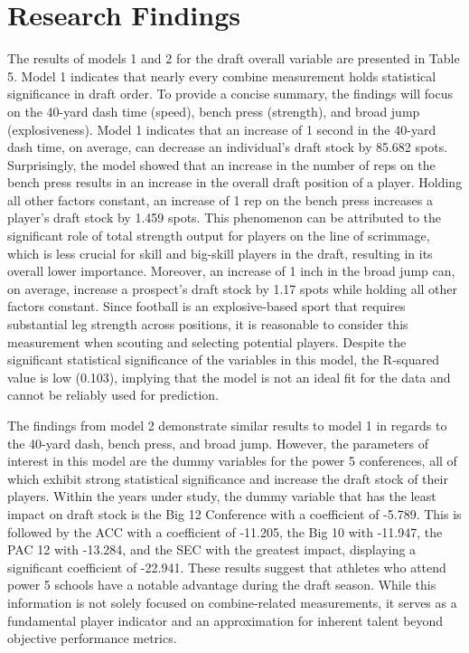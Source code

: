 \documentclass[12pt,english]{article}
\begin{document}
\section{Research Findings}\label{sec:results}
The results of models 1 and 2 for the draft overall variable are presented in Table 5. Model 1 indicates that nearly every combine measurement holds statistical significance in draft order. To provide a concise summary, the findings will focus on the 40-yard dash time (speed), bench press (strength), and broad jump (explosiveness). Model 1 indicates that an increase of 1 second in the 40-yard dash time, on average, can decrease an individual's draft stock by 85.682 spots. Surprisingly, the model showed that an increase in the number of reps on the bench press results in an increase in the overall draft position of a player. Holding all other factors constant, an increase of 1 rep on the bench press increases a player's draft stock by 1.459 spots. This phenomenon can be attributed to the significant role of total strength output for players on the line of scrimmage, which is less crucial for skill and big-skill players in the draft, resulting in its overall lower importance. Moreover, an increase of 1 inch in the broad jump can, on average, increase a prospect's draft stock by 1.17 spots while holding all other factors constant. Since football is an explosive-based sport that requires substantial leg strength across positions, it is reasonable to consider this measurement when scouting and selecting potential players. Despite the significant statistical significance of the variables in this model, the R-squared value is low (0.103), implying that the model is not an ideal fit for the data and cannot be reliably used for prediction.

The findings from model 2 demonstrate similar results to model 1 in regards to the 40-yard dash, bench press, and broad jump. However, the parameters of interest in this model are the dummy variables for the power 5 conferences, all of which exhibit strong statistical significance and increase the draft stock of their players. Within the years under study, the dummy variable that has the least impact on draft stock is the Big 12 Conference with a coefficient of -5.789. This is followed by the ACC with a coefficient of -11.205, the Big 10 with -11.947, the PAC 12 with -13.284, and the SEC with the greatest impact, displaying a significant coefficient of -22.941. These results suggest that athletes who attend power 5 schools have a notable advantage during the draft season. While this information is not solely focused on combine-related measurements, it serves as a fundamental player indicator and an approximation for inherent talent beyond objective performance metrics.
\end{document}
